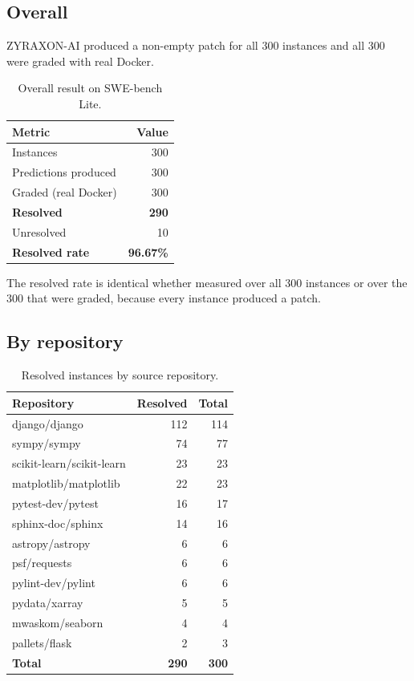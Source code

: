 \documentclass[11pt,a4paper]{article}
\begin{document}
\subsection{Overall}

ZYRAXON-AI produced a non-empty patch for all 300 instances and all 300 were graded with
real Docker.

\begin{table}[H]
\centering
\caption{Overall result on SWE-bench Lite.}
\label{tab:overall}
\begin{tabular}{@{}lr@{}}
\toprule
Metric & Value \\
\midrule
Instances & 300 \\
Predictions produced & 300 \\
Graded (real Docker) & 300 \\
\textbf{Resolved} & \textbf{290} \\
Unresolved & 10 \\
\textbf{Resolved rate} & \textbf{96.67\%} \\
\bottomrule
\end{tabular}
\end{table}

The resolved rate is identical whether measured over all 300 instances or over the 300
that were graded, because every instance produced a patch.

\subsection{By repository}

\begin{table}[H]
\centering
\caption{Resolved instances by source repository.}
\label{tab:byrepo}
\begin{tabular}{@{}lrr@{}}
\toprule
Repository & Resolved & Total \\
\midrule
django/django & 112 & 114 \\
sympy/sympy & 74 & 77 \\
scikit-learn/scikit-learn & 23 & 23 \\
matplotlib/matplotlib & 22 & 23 \\
pytest-dev/pytest & 16 & 17 \\
sphinx-doc/sphinx & 14 & 16 \\
astropy/astropy & 6 & 6 \\
psf/requests & 6 & 6 \\
pylint-dev/pylint & 6 & 6 \\
pydata/xarray & 5 & 5 \\
mwaskom/seaborn & 4 & 4 \\
pallets/flask & 2 & 3 \\
\midrule
\textbf{Total} & \textbf{290} & \textbf{300} \\
\bottomrule
\end{tabular}
\end{table}
\end{document}
